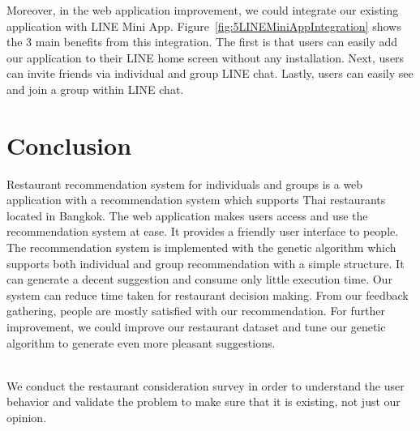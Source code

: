 \documentclass[12pt,oneside,openright,a4paper]{cpe-english-project}
\begin{document}
Moreover, in the web application improvement, we could integrate our existing application with LINE Mini App. Figure~\ref{fig:5LINEMiniAppIntegration} shows the 3 main benefits from this integration. The first is that users can easily add our application to their LINE home screen without any installation. Next, users can invite friends via individual and group LINE chat. Lastly, users can easily see and join a group within LINE chat.

\section{Conclusion}

Restaurant recommendation system for individuals and groups is a web application with a recommendation system which supports Thai restaurants located in Bangkok. The web application makes users access and use the recommendation system at ease. It provides a friendly user interface to people. The recommendation system is implemented with the genetic algorithm which supports both individual and group recommendation with a simple structure. It can generate a decent suggestion and consume only little execution time. Our system can reduce time taken for restaurant decision making. From our feedback gathering, people are mostly satisfied with our recommendation. For further improvement, we could improve our restaurant dataset and tune our genetic algorithm to generate even more pleasant suggestions.






 \\

We conduct the restaurant consideration survey in order to understand the user behavior and validate the problem to make sure that it is existing, not just our opinion.
\end{document}
